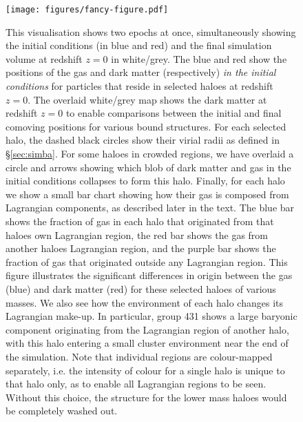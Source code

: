 \begin{figure}
	\centering
	\vspace{0.5cm}
	\texttt{[image: figures/fancy-figure.pdf]}
 \caption{ This visualisation shows two epochs at once, simultaneously
 showing the initial conditions (in blue and red) and the final simulation
 volume at redshift $z=0$ in white/grey. The blue and red show the positions
 of the gas and dark matter (respectively) \emph{in the initial conditions}
 for particles that reside in selected haloes at redshift $z=0$. The overlaid
 white/grey map shows the dark matter at redshift $z=0$ to enable comparisons
 between the initial and final comoving positions for various bound
 structures. For each selected halo, the dashed black circles show their
 virial radii as defined in \S \ref{sec:simba}. For some haloes in crowded
 regions, we have overlaid a circle and arrows showing which blob of dark
 matter and gas in the initial conditions collapses to form this halo.
 Finally, for each halo we show a small bar chart showing how their gas is
 composed from Lagrangian components, as described later in the text. The
 blue bar shows the fraction of gas in each halo that originated from that
 haloes own Lagrangian region, the red bar shows the gas from another haloes
 Lagrangian region, and the purple bar shows the fraction of gas that
 originated outside any Lagrangian region. This figure illustrates the
 significant differences in origin between the gas (blue) and dark matter
 (red) for these selected haloes of various masses. We also see how the
 environment of each halo changes its Lagrangian make-up. In particular,
 group 431 shows a large baryonic component originating from the Lagrangian
 region of another halo, with this halo entering a small cluster environment
 near the end of the simulation. Note that individual regions are
 colour-mapped separately, i.e. the intensity of colour for a single halo is
 unique to that halo only, as to enable all Lagrangian regions to be seen.
 Without this choice, the structure for the lower mass haloes would be
 completely washed out.}
	\vspace{1cm}
	\label{fig:bigtransferpic}
\end{figure}


